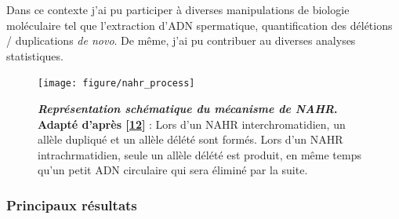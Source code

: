 \documentclass[12pt,twoside]{ugathesis}
\begin{document}
Dans ce contexte j'ai pu participer à diverses manipulations de biologie
moléculaire tel que l'extraction d'ADN spermatique, quantification des
délétions / duplications \emph{de novo}. De même, j'ai pu contribuer au
diverses analyses statistiques.

\newpage 

\begin{figure}

{\centering \texttt{[image: figure/nahr\_process]} 

}

\caption[Représentation schématique du mécanisme de NAHR]{\textbf{\emph{Représentation schématique du mécanisme de
NAHR}. Adapté d'après {[}\protect\hyperlink{ref-Pierre2012}{12}{]}} :
Lors d'un NAHR interchromatidien, un allèle dupliqué et un allèle délété
sont formés. Lors d'un NAHR intrachrmatidien, seule un allèle délété est
produit, en même temps qu'un petit ADN circulaire qui sera éliminé par
la suite.}\label{fig:pictnahr}
\end{figure}








\newpage



\newpage

\subsubsection{Principaux résultats}\label{principaux-resultats}
\end{document}

